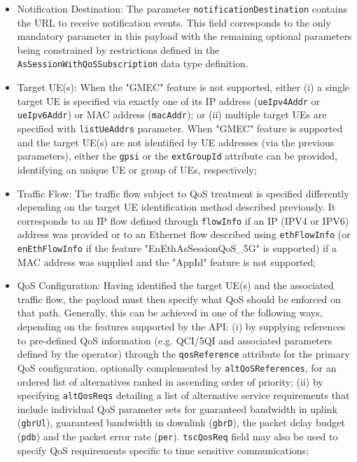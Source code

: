 \begin{itemize}
    \item Notification Destination: The parameter \texttt{notificationDestination} contains the \acs{URL} to receive notification events. This field corresponds to the only mandatory parameter in this payload with the remaining optional parameters being constrained by restrictions defined in the \texttt{AsSessionWithQoSSubscription} data type definition.
    \item Target \acs{UE}(s): When the "GMEC" feature is not supported, either (i) a single target \acs{UE} is specified via exactly one of its \acs{IP} address (\texttt{ueIpv4Addr} or \texttt{ueIpv6Addr}) or \acs{MAC} address (\texttt{macAddr}); or (ii) multiple target \acsp{UE} are specified with \texttt{listUeAddrs} parameter. When "GMEC" feature is supported and the target \acs{UE}(s) are not identified by \acs{UE} addresses (via the previous parameters), either the \texttt{gpsi} or the \texttt{extGroupId} attribute can be provided, identifying an unique \acs{UE} or group of \acsp{UE}, respectively;
    \item Traffic Flow: The traffic flow subject to \acs{QoS} treatment is specified differently depending on the target \acs{UE} identification method described previously. It corresponds to an IP flow defined through \texttt{flowInfo} if an IP (IPV4 or IPV6) address was provided or to an Ethernet flow described using \texttt{ethFlowInfo} (or \texttt{enEthFlowInfo} if the feature "EnEthAsSessionQoS\_5G" is supported) if a \acs{MAC} address was supplied and the "AppId" feature is not supported;
    \item \acs{QoS} Configuration: Having identified the target \acs{UE}(s) and the associated traffic flow, the payload must then specify what \acs{QoS} should be enforced on that path. Generally, this can be achieved in one of the following ways, depending on the features supported by the \acs{API}: (i) by supplying references to pre-defined \acs{QoS} information (e.g. \acs{QCI}/\acs{5QI} and associated parameters defined by the operator) through the \texttt{qosReference} attribute for the primary \acs{QoS} configuration, optionally complemented by \texttt{altQoSReferences}, for an ordered list of alternatives ranked in ascending order of priority; (ii) by specifying \texttt{altQosReqs} detailing a list of alternative service requirements that include individual \acs{QoS} parameter sets for guaranteed bandwidth in uplink (\texttt{gbrUl}), guaranteed bandwidth in downlink (\texttt{gbrD}), the packet delay budget (\texttt{pdb}) and the packet error rate (\texttt{per}). \texttt{tscQosReq} field may also be used to specify \acs{QoS} requirements specific to time sensitive communications;

\end{itemize}
